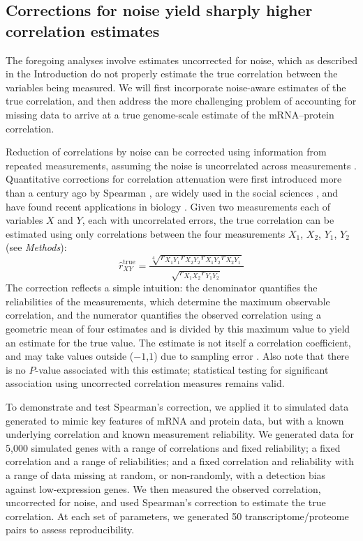 \documentclass[10pt]{article}
\begin{document}
\subsection*{Corrections for noise yield sharply higher correlation estimates}

The foregoing analyses involve estimates uncorrected for noise, which as described in the Introduction do not properly estimate the true correlation between the variables being measured. We will first incorporate noise-aware estimates of the true correlation, and then address the more challenging problem of accounting for missing data to arrive at a true genome-scale estimate of the mRNA--protein correlation.

Reduction of correlations by noise can be corrected using information
from repeated measurements, assuming the noise is uncorrelated
across measurements \cite{schmidt99,spearman04}. Quantitative
corrections for correlation attenuation were first introduced more
than a century ago by Spearman \cite{spearman04}, are widely used in
the social sciences \cite{muchinsky96,schmidt99,zimmerman97}, and have
found recent applications in biology
\cite{Drummond2005, adolph07,archer08,archer07,behseta09,Vogel2010}. Given two
measurements each of variables \(X\) and \(Y\), each with uncorrelated
errors, the true correlation can be estimated using only correlations
between the four measurements \(X_1\), \(X_2\), \(Y_1\), \(Y_2\) 
(see \emph{Methods}):
\begin{equation}
  \hat{r}_{XY}^\text{true} = 
  \frac{\sqrt[4]{r_{X_1Y_1} r_{X_2Y_2} r_{X_1Y_2} r_{X_2Y_1}}}%
       {\sqrt{r_{X_1X_2} r_{Y_1Y_2}}}
\end{equation}
The correction reflects a simple intuition: the denominator quantifies
the reliabilities of the measurements, which determine the maximum
observable correlation, and the numerator quantifies the observed
correlation using a geometric mean of four estimates and is divided by
this maximum value to yield an estimate for the true value. The estimate
is not itself a correlation coefficient, and may take values outside
($-1$,$1$) due to sampling error \cite{schmidt99}. Also note that there is no $P$-value associated with this estimate; statistical testing for significant association using uncorrected correlation measures remains valid.

To demonstrate and test Spearman's correction, we applied it to simulated data
generated to mimic key features of mRNA and protein data, but with a known
underlying correlation and known measurement reliability. We generated data
for 5,000 simulated genes with a range of correlations and fixed reliability;
a fixed correlation and a range of reliabilities; and a fixed correlation and
reliability with a range of data missing at random, or non-randomly, with a
detection bias against low-expression genes. We then measured the observed
correlation, uncorrected for noise, and used Spearman's correction to estimate
the true correlation. At each set of parameters, we generated 50
transcriptome/proteome pairs to assess reproducibility.
\end{document}
